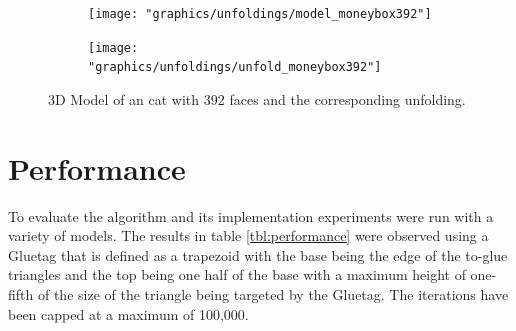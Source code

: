 \documentclass[draft,final]{vutinfth} %
\begin{document}
\begin{figure}
  \begin{subfigure}[b]{0.475\textwidth}
    \texttt{[image: "graphics/unfoldings/model\_moneybox392"]}
  \end{subfigure}
  \begin{subfigure}[b]{0.475\textwidth}
    \texttt{[image: "graphics/unfoldings/unfold\_moneybox392"]}
  \end{subfigure}
  
  \caption{3D Model of an cat with 392 faces and the corresponding unfolding.}
  \label{fig:moneybox392}
\end{figure}

\section{Performance}
\label{sec:performance}

To evaluate the algorithm and its implementation experiments were run with a variety of models. The results in table \ref{tbl:performance} were observed using a Gluetag that is defined as a trapezoid with the base being the edge of the to-glue triangles and the top being one half of the base with a maximum height of one-fifth of the size of the triangle being targeted by the Gluetag. The iterations have been capped at a maximum of 100,000.
\end{document}

